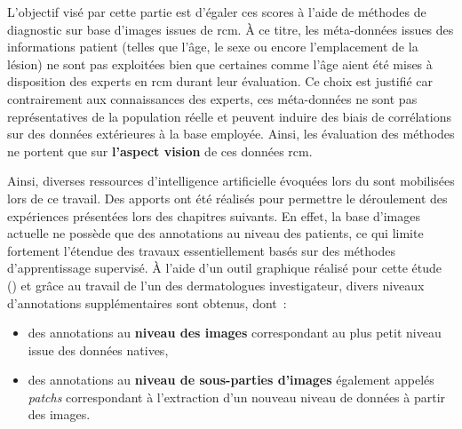 L'objectif visé par cette partie est d'égaler ces scores à l'aide de méthodes de diagnostic sur base d'images issues de \gls{rcm}. À ce titre, les méta-données issues des informations patient (telles que l'âge, le sexe ou encore l'emplacement de la lésion) ne sont pas exploitées bien que certaines comme l'âge aient été mises à disposition des experts en \gls{rcm} durant leur évaluation. Ce choix est justifié car contrairement aux connaissances des experts, ces méta-données ne sont pas représentatives de la population réelle et peuvent induire des biais de corrélations sur des données extérieures à la base employée. Ainsi, les évaluation des méthodes ne portent que sur \textbf{l'aspect vision} de ces données \gls{rcm}.\par

Ainsi, diverses ressources d'intelligence artificielle évoquées lors du  sont mobilisées lors de ce travail. Des apports ont été réalisés pour permettre le déroulement des expériences présentées lors des chapitres suivants. En effet, la base d'images actuelle ne possède que des annotations au niveau des patients, ce qui limite fortement l'étendue des travaux essentiellement basés sur des méthodes d'apprentissage supervisé. À l'aide d'un outil graphique réalisé pour cette étude () et grâce au travail de l'un des dermatologues investigateur, divers niveaux d'annotations supplémentaires sont obtenus, dont~:
\begin{itemize}
    \item des annotations au \textbf{niveau des images} correspondant au plus petit niveau issue des données natives,
    \item des annotations au \textbf{niveau de sous-parties d'images} également appelés \textit{patchs} correspondant à l'extraction d'un nouveau niveau de données à partir des images.
\end{itemize}\par
\clearpage

